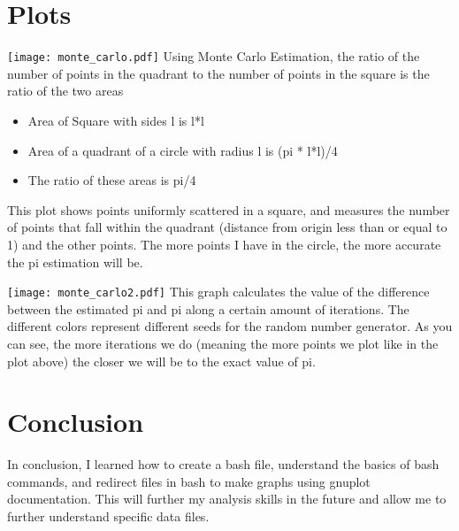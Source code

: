 \documentclass{article}
\begin{document}
\section{Plots}

\texttt{[image: monte\_carlo.pdf]}
Using Monte Carlo Estimation, the ratio of the number of points in the quadrant to the number of points in the square is the ratio of the two areas
\begin{itemize}
    \item Area of Square with sides l is l*l
    \item Area of a quadrant of a circle with radius l is (pi * l*l)/4
    \item The ratio of these areas is pi/4
\end{itemize}
This plot shows points uniformly scattered in a square, and measures
the number of points that fall within the quadrant (distance from origin less than or equal to 1) and the other points. The more points I have in the circle, the more accurate the pi estimation will be.

\texttt{[image: monte\_carlo2.pdf]}
This graph calculates the value of the difference between the estimated pi and pi along a certain amount of iterations. The different colors represent different seeds for the random number generator. As you can see, the more iterations we do (meaning the more points we plot like in the plot above) the closer we will be to the exact value of pi.\\
\section{Conclusion}
In conclusion, I learned how to create a bash file, understand the basics of bash commands, and redirect files in bash to make graphs using gnuplot documentation. This will further my analysis skills in the future and allow me to further understand specific data files.
\end{document}
